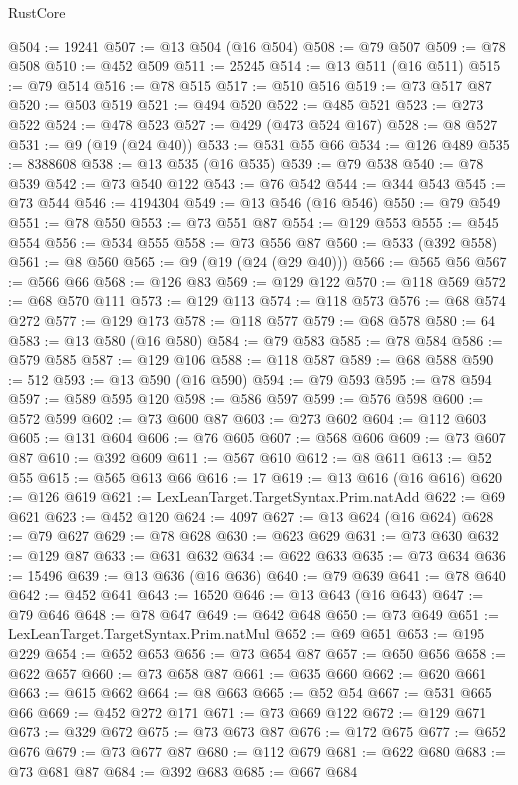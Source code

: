 \begin{lexlean}{RustCore}
\begin{coremodule}
@504 := 19241
@507 := @13 @504 (@16 @504)
@508 := @79 @507
@509 := @78 @508
@510 := @452 @509
@511 := 25245
@514 := @13 @511 (@16 @511)
@515 := @79 @514
@516 := @78 @515
@517 := @510 @516
@519 := @73 @517 @87
@520 := @503 @519
@521 := @494 @520
@522 := @485 @521
@523 := @273 @522
@524 := @478 @523
@527 := @429 (@473 @524 @167)
@528 := @8 @527
@531 := @9 (@19 (@24 @40))
@533 := @531 @55 @66
@534 := @126 @489
@535 := 8388608
@538 := @13 @535 (@16 @535)
@539 := @79 @538
@540 := @78 @539
@542 := @73 @540 @122
@543 := @76 @542
@544 := @344 @543
@545 := @73 @544
@546 := 4194304
@549 := @13 @546 (@16 @546)
@550 := @79 @549
@551 := @78 @550
@553 := @73 @551 @87
@554 := @129 @553
@555 := @545 @554
@556 := @534 @555
@558 := @73 @556 @87
@560 := @533 (@392 @558)
@561 := @8 @560
@565 := @9 (@19 (@24 (@29 @40)))
@566 := @565 @56
@567 := @566 @66
@568 := @126 @83
@569 := @129 @122
@570 := @118 @569
@572 := @68 @570 @111
@573 := @129 @113
@574 := @118 @573
@576 := @68 @574 @272
@577 := @129 @173
@578 := @118 @577
@579 := @68 @578
@580 := 64
@583 := @13 @580 (@16 @580)
@584 := @79 @583
@585 := @78 @584
@586 := @579 @585
@587 := @129 @106
@588 := @118 @587
@589 := @68 @588
@590 := 512
@593 := @13 @590 (@16 @590)
@594 := @79 @593
@595 := @78 @594
@597 := @589 @595 @120
@598 := @586 @597
@599 := @576 @598
@600 := @572 @599
@602 := @73 @600 @87
@603 := @273 @602
@604 := @112 @603
@605 := @131 @604
@606 := @76 @605
@607 := @568 @606
@609 := @73 @607 @87
@610 := @392 @609
@611 := @567 @610
@612 := @8 @611
@613 := @52 @55
@615 := @565 @613 @66
@616 := 17
@619 := @13 @616 (@16 @616)
@620 := @126 @619
@621 := LexLeanTarget.TargetSyntax.Prim.natAdd
@622 := @69 @621
@623 := @452 @120
@624 := 4097
@627 := @13 @624 (@16 @624)
@628 := @79 @627
@629 := @78 @628
@630 := @623 @629
@631 := @73 @630
@632 := @129 @87
@633 := @631 @632
@634 := @622 @633
@635 := @73 @634
@636 := 15496
@639 := @13 @636 (@16 @636)
@640 := @79 @639
@641 := @78 @640
@642 := @452 @641
@643 := 16520
@646 := @13 @643 (@16 @643)
@647 := @79 @646
@648 := @78 @647
@649 := @642 @648
@650 := @73 @649
@651 := LexLeanTarget.TargetSyntax.Prim.natMul
@652 := @69 @651
@653 := @195 @229
@654 := @652 @653
@656 := @73 @654 @87
@657 := @650 @656
@658 := @622 @657
@660 := @73 @658 @87
@661 := @635 @660
@662 := @620 @661
@663 := @615 @662
@664 := @8 @663
@665 := @52 @54
@667 := @531 @665 @66
@669 := @452 @272 @171
@671 := @73 @669 @122
@672 := @129 @671
@673 := @329 @672
@675 := @73 @673 @87
@676 := @172 @675
@677 := @652 @676
@679 := @73 @677 @87
@680 := @112 @679
@681 := @622 @680
@683 := @73 @681 @87
@684 := @392 @683
@685 := @667 @684

\end{coremodule}
\end{lexlean}
